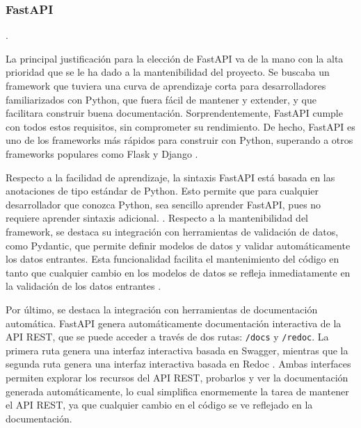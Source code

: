\subsubsection{FastAPI}

 \cite{fastapi_docs}.

La principal justificación para la elección de \gls{FastAPI} va de la mano con la alta prioridad que se le ha dado a la mantenibilidad del proyecto. Se buscaba un framework que tuviera una curva de aprendizaje corta para desarrolladores familiarizados con \gls{Python}, que fuera fácil de mantener y extender, y que facilitara construir buena documentación. Sorprendentemente, \gls{FastAPI} cumple con todos estos requisitos, sin comprometer su rendimiento. De hecho, \gls{FastAPI} es uno de los frameworks más rápidos para construir  con \gls{Python}, superando a otros frameworks populares como Flask y Django \cite{fastapi_benchmarks}.

Respecto a la facilidad de aprendizaje, la sintaxis \gls{FastAPI} está basada en las anotaciones de tipo estándar de \gls{Python}. Esto permite que para cualquier desarrollador que conozca \gls{Python}, sea sencillo aprender \gls{FastAPI}, pues no requiere aprender sintaxis adicional. \cite{fastapi_features}. Respecto a la mantenibilidad del framework, se destaca su integración con herramientas de validación de datos, como \gls{Pydantic}, que permite definir modelos de datos y validar automáticamente los datos entrantes. Esta funcionalidad facilita el mantenimiento del código en tanto que cualquier cambio en los modelos de datos se refleja inmediatamente en la validación de los datos entrantes \cite{fastapi_features}.

Por último, se destaca la integración con herramientas de documentación automática. \gls{FastAPI} genera automáticamente documentación interactiva de la \gls{API REST}, que se puede acceder a través de dos rutas: \verb|/docs| y \verb|/redoc|. La primera ruta genera una interfaz interactiva basada en \gls{Swagger}, mientras que la segunda ruta genera una interfaz interactiva basada en \gls{Redoc} \cite{fastapi_features}. Ambas interfaces permiten explorar los recursos del \gls{API REST}, probarlos y ver la documentación generada automáticamente, lo cual simplifica enormemente la tarea de mantener el \gls{API REST}, ya que cualquier cambio en el código se ve reflejado en la documentación.

